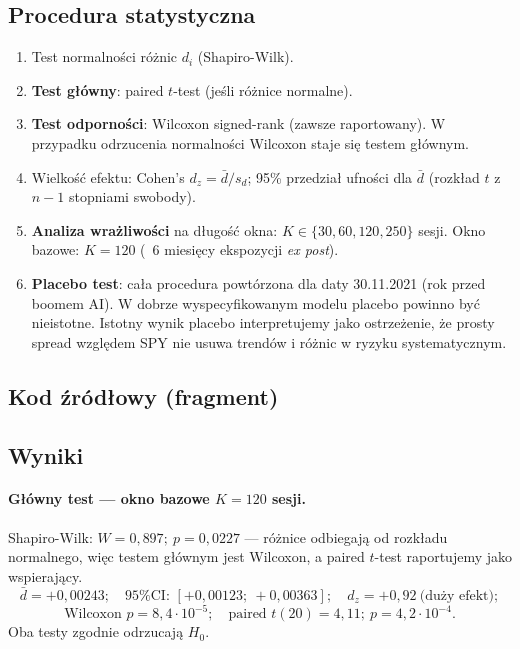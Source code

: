 \documentclass[11pt,a4paper]{article}
\begin{document}
\subsection{Procedura statystyczna}
\begin{enumerate}
  \item Test normalności różnic $d_i$ (Shapiro-Wilk).
  \item \textbf{Test główny}: paired $t$-test (jeśli różnice normalne).
  \item \textbf{Test odporności}: Wilcoxon signed-rank (zawsze raportowany).
        W przypadku odrzucenia normalności Wilcoxon staje się testem głównym.
  \item Wielkość efektu: Cohen's $d_z = \bar d / s_d$; 95\% przedział ufności
        dla $\bar d$ (rozkład $t$ z $n - 1$ stopniami swobody).
  \item \textbf{Analiza wrażliwości} na długość okna: $K \in \{30, 60, 120, 250\}$
        sesji. Okno bazowe: $K = 120$ (~6 miesięcy ekspozycji \emph{ex post}).
  \item \textbf{Placebo test}: cała procedura powtórzona dla daty 30.11.2021
        (rok przed boomem AI). W dobrze wyspecyfikowanym modelu placebo powinno
        być nieistotne. Istotny wynik placebo interpretujemy jako ostrzeżenie,
        że prosty spread względem SPY nie usuwa trendów i różnic w ryzyku
        systematycznym.
\end{enumerate}

\subsection{Kod źródłowy (fragment)}


\subsection{Wyniki}

\paragraph{Główny test --- okno bazowe $K = 120$ sesji.}
Shapiro-Wilk: $W = 0{,}897;\ p = 0{,}0227$ --- różnice odbiegają od rozkładu
normalnego, więc testem głównym jest Wilcoxon, a paired $t$-test raportujemy
jako wspierający.
\[
\bar d = +0{,}00243;\quad
\text{95\% CI: } [+0{,}00123;\ +0{,}00363];\quad
 d_z = +0{,}92\ \text{(duży efekt)};
\]
\[
\text{Wilcoxon } p = 8{,}4 \cdot 10^{-5};\quad
\text{paired } t(20) = 4{,}11;\ p = 4{,}2 \cdot 10^{-4}.
\]
Oba testy zgodnie odrzucają $H_0$.
\end{document}
